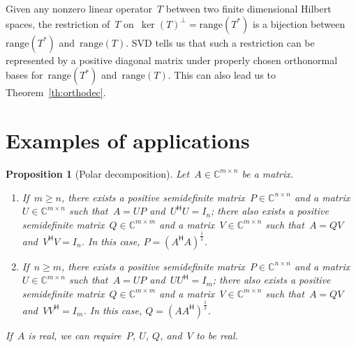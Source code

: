 \documentclass[11pt,a4paper]{article}  %
\numberwithin{equation}{section}
\newtheorem{proposition}{Proposition}%
\theoremstyle{definition}
\def\CC{\mathbb{C}}
\newcommand{\hmt}{{\scriptscriptstyle{{\mathsf{H}}}}}
\newcommand{\range}{\mathrm{range}}
\begin{document}
Given any nonzero linear operator~$T$ between two finite dimensional Hilbert spaces, the restriction
of~$T$ on~$\ker(T)^\perp = \range(T^*)$ is a bijection between~$\range(T^*)$ and~$\range(T)$.
SVD tells us that such a restriction can be represented by a positive diagonal matrix under properly
chosen orthonormal bases for~$\range(T^*)$ and~$\range(T)$.
This can also lead us to Theorem~\ref{th:orthodec}.


\section{Examples of applications}

\begin{proposition}[Polar decomposition]
  \label{th:polar} Let~$A \in \CC^{m\times n}$ be a matrix.
  \begin{enumerate}[leftmargin=1.5em]
    \item If~$m\ge n$, there exists a positive semidefinite matrix~$P \in \CC^{n\times n}$ and
      a matrix~$U\in \CC^{m\times n}$ such that~$A = UP$ and~$U^\hmt U = I_n$; there also exists
      a positive semidefinite matrix~$Q\in \CC^{m\times m}$ and a matrix~$V\in\CC^{m\times n}$ such
      that~$A = QV$ and~$V^\hmt V = I_n$.
      In this case, $P = (A^\hmt A)^{\frac{1}{2}}$.
    \item If~$n\ge m$, there exists a positive semidefinite matrix~$P \in \CC^{n\times n}$ and
      a matrix~$U\in \CC^{m\times n}$ such that~$A = UP$ and~$UU^\hmt = I_m$; there also exists
      a positive semidefinite matrix~$Q\in \CC^{m\times m}$ and a matrix~$V\in\CC^{m\times n}$ such
      that~$A = QV$ and~$V V^\hmt = I_m$. In this case, $Q = (AA^\hmt)^{\frac{1}{2}}$.
  \end{enumerate}
   If~$A$ is real, we can require~$P$, $U$, $Q$, and~$V$ to be real.
\end{proposition}
\end{document}

